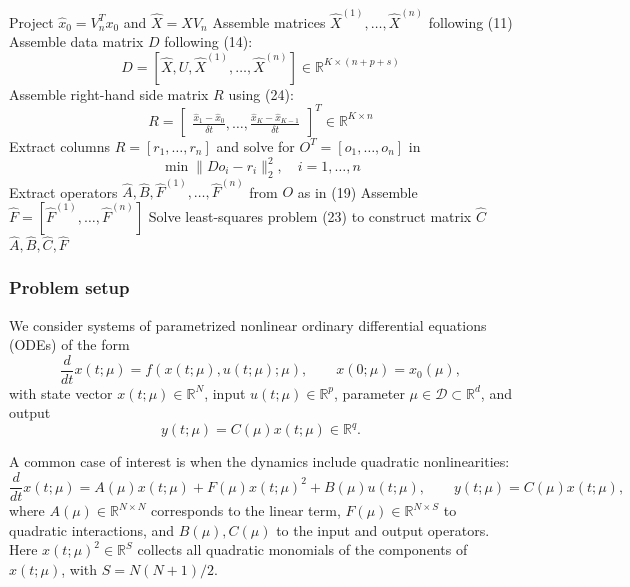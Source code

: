 \documentclass{article}
\begin{document}
\begin{algorithm}
\begin{algorithmic}[1]
    \State Project $\hat{x}_0 = V_n^T x_0$ and $\hat{X} = X V_n$
    \State Assemble matrices $\hat{X}^{(1)}, \dots, \hat{X}^{(n)}$ following (11)
    \State Assemble data matrix $D$ following (14): 
          \[
             D = [\hat{X}, U, \hat{X}^{(1)}, \dots, \hat{X}^{(n)}] \in \mathbb{R}^{K \times (n+p+s)}
          \]
    \State Assemble right-hand side matrix $R$ using (24): 
          \[
             R = 
             \begin{bmatrix}
                \frac{\hat{x}_1 - \hat{x}_0}{\delta t}, \dots, 
                \frac{\hat{x}_K - \hat{x}_{K-1}}{\delta t}
             \end{bmatrix}^T 
             \in \mathbb{R}^{K \times n}
          \]
    \State Extract columns $R = [r_1, \dots, r_n]$ and solve for $O^T = [o_1, \dots, o_n]$ in
          \[
             \min \|D o_i - r_i\|_2^2, \quad i = 1, \dots, n
          \]
    \State Extract operators $\hat{A}, \hat{B}, \hat{F}^{(1)}, \dots, \hat{F}^{(n)}$ from $O$ as in (19)
    \State Assemble $\hat{F} = [\hat{F}^{(1)}, \dots, \hat{F}^{(n)}]$
    \State Solve least-squares problem (23) to construct matrix $\hat{C}$
    \State \Return $\hat{A}, \hat{B}, \hat{C}, \hat{F}$
\EndProcedure
\end{algorithmic}
\end{algorithm}

\vspace{1cm}


\subsubsection*{Problem setup}

We consider systems of parametrized nonlinear ordinary differential equations (ODEs) of the form
\[
\frac{d}{dt} x(t;\mu) = f(x(t;\mu), u(t;\mu); \mu),
\qquad x(0;\mu) = x_0(\mu),
\]
with state vector $x(t;\mu) \in \mathbb{R}^N$, input $u(t;\mu) \in \mathbb{R}^p$, 
parameter $\mu \in \mathcal{D} \subset \mathbb{R}^d$, and output
\[
y(t;\mu) = C(\mu)x(t;\mu) \in \mathbb{R}^q.
\]

A common case of interest is when the dynamics include quadratic nonlinearities:
\[
\frac{d}{dt} x(t;\mu) = A(\mu)x(t;\mu) + F(\mu)x(t;\mu)^2 + B(\mu)u(t;\mu),
\qquad y(t;\mu) = C(\mu)x(t;\mu),
\]
where $A(\mu) \in \mathbb{R}^{N \times N}$ corresponds to the linear term, 
$F(\mu) \in \mathbb{R}^{N \times S}$ to quadratic interactions, and 
$B(\mu), C(\mu)$ to the input and output operators.  
Here $x(t;\mu)^2 \in \mathbb{R}^S$ collects all quadratic monomials of the components of $x(t;\mu)$, 
with $S = N(N+1)/2$.  
\end{document}
